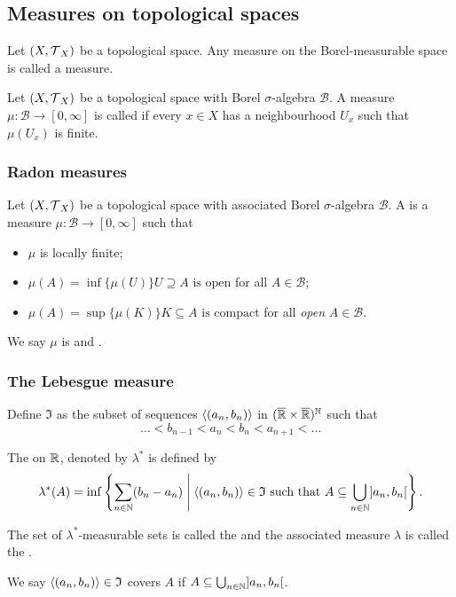 \subsection{Measures on topological spaces}
\begin{definition}
Let $\left( X, \operatorname{\mathcal{T}}_X \right)$ be a topological space. Any measure on the Borel-measurable space is called a  measure. 
\end{definition}


\begin{definition}
Let $\left( X, \operatorname{\mathcal{T}}_X \right)$ be a topological space with Borel $\sigma$-algebra $\mathcal{B}$. A measure $\mu: \mathcal{B} \to [0,\infty]$ is called  if every $x\in X$ has a neighbourhood $U_x$ such that $\mu(U_x)$ is finite.
\end{definition}

\subsubsection{Radon measures}
\begin{definition}
Let $\left( X, \operatorname{\mathcal{T}}_X \right)$ be a topological space with associated Borel $\sigma$-algebra $\mathcal{B}$. A  is a measure $\mu: \mathcal{B}\to [0,\infty]$ such that
\begin{itemize}
\item $\mu$ is locally finite;
\item $\mu(A) = \inf\{\mu(U)\}{\text{$U\supseteq A$ is open}}$ for all $A\in \mathcal{B}$;
\item $\mu(A) = \sup\{\mu(K)\}{\text{$K\subseteq A$ is compact}}$ for all \emph{open} $A\in \mathcal{B}$.
\end{itemize}
We say $\mu$ is  and .
\end{definition}

\subsubsection{The Lebesgue measure}
\begin{definition}
Define $\mathfrak{I}$ as the subset of sequences $\left\langle (a_n,b_n) \right\rangle$ in $(\overline{\mathbb{R}}\times\overline{\mathbb{R}})^{\mathbb{N}}$ such that
\[ \ldots < b_{n-1}< a_n < b_n < a_{n+1} < \ldots \]

The  on $\mathbb{R}$, denoted by $\lambda^*$ is defined by
\[ \lambda^*(A) = \inf\left\{ \sum_{n\in \mathbb{N}}(b_n-a_n) \;\middle|\; \text{$\left\langle (a_n,b_n) \right\rangle\in \mathfrak{I}$ such that $A \subseteq \bigcup_{n\in\mathbb{N}} ]a_n, b_n[$} \right\}. \]

The set of $\lambda^*$-measurable sets is called the  and the associated measure $\lambda$ is called the .
\end{definition}
We say $\left\langle (a_n,b_n) \right\rangle\in \mathfrak{I}$ covers $A$ if $A \subseteq \bigcup_{n\in\mathbb{N}} ]a_n, b_n[$.

